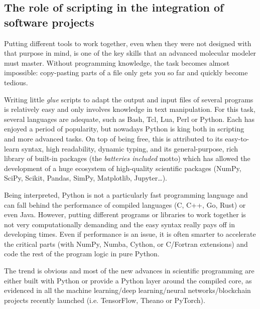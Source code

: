 


\subsection{The role of scripting in the integration of software projects}

Putting different tools to work together, even when they were not designed with that purpose in mind, is one of the key skills that an advanced molecular modeler must master. Without programming knowledge, the task becomes almost impossible: copy-pasting parts of a file only gets you so far and quickly become tedious.

Writing little \textit{glue} scripts to adapt the output and input files of several programs is relatively easy and only involves knowledge in text manipulation. For this task, several languages are adequate, such as Bash, Tcl, Lua, Perl or Python. Each has enjoyed a period of popularity, but nowadays Python is king both in scripting and more advanced tasks.\cite{pythonpaypal} On top of being free, this is attributed to its easy-to-learn syntax, high readability, dynamic typing, and its general-purpose, rich library of built-in packages (the \textit{batteries included} motto) which has allowed the development of a huge ecosystem of high-quality scientific packages (NumPy, SciPy, Scikit, Pandas, SimPy, Matplotlib, Jupyter\ldots).

Being interpreted, Python is not a particularly fast programming language and can fall behind the performance of compiled languages (C, C++, Go, Rust) or even Java. However, putting different programs or libraries to work together is not very computationally demanding and the easy syntax really pays off in developing times. Even if performance is an issue, it is often smarter to accelerate the critical parts (with NumPy,\cite{numpy} Numba,\cite{numba} Cython,\cite{cython} or C/Fortran extensions) and code the rest of the program logic in pure Python.

The trend is obvious and most of the new advances in scientific programming are either built with Python or provide a Python layer around the compiled core, as evidenced in all the machine learning/deep learning/neural networks/blockchain projects recently launched (i.e. TensorFlow,\cite{tensorflow} Theano\cite{theano} or PyTorch\cite{pytorch}).

